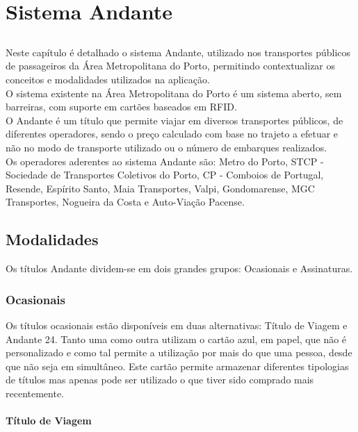 \chapter{Sistema Andante}\label{chap:andante}

\section*{}

Neste capítulo é detalhado o sistema Andante, utilizado nos transportes públicos de passageiros da Área Metropolitana do Porto, permitindo contextualizar os conceitos e modalidades utilizados na aplicação.
\\O sistema existente na Área Metropolitana do Porto é um sistema aberto, sem barreiras, com suporte em cartões baseados em RFID.
\\O Andante é um título que permite viajar em diversos transportes públicos, de diferentes operadores, sendo o preço calculado com base no trajeto a efetuar e não no modo de transporte utilizado ou o número de embarques realizados.
\\Os operadores aderentes ao sistema Andante são: Metro do Porto, STCP - Sociedade de Transportes Coletivos do Porto, CP - Comboios de Portugal, Resende, Espírito Santo, Maia Transportes, Valpi, Gondomarense, MGC Transportes, Nogueira da Costa e Auto-Viação Pacense. 

\section{Modalidades}

Os títulos Andante dividem-se em dois grandes grupos: Ocasionais e Assinaturas.

\subsection{Ocasionais}

Os títulos ocasionais estão disponíveis em duas alternativas: Título de Viagem e Andante 24. Tanto uma como outra utilizam o cartão azul, em papel, que não é personalizado e como tal permite a utilização por mais do que uma pessoa, desde que não seja em simultâneo. Este cartão permite armazenar diferentes tipologias de títulos mas apenas pode ser utilizado o que tiver sido comprado mais recentemente.

\subsubsection{Título de Viagem}

